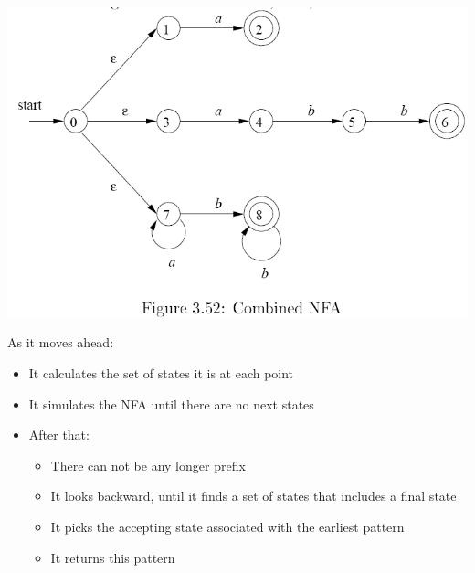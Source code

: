 \documentclass{article}[18pt]
\begin{document}
\begin{center}
	\includegraphics[scale=0.7]{combined}
\end{center}
As it moves ahead:
\begin{itemize}
	\item It calculates the set of states it is at each point
	\item It simulates the NFA until there are no next states
	\item After that:
	\begin{itemize}
		\item There can not be any longer prefix
		\item It looks backward, until it finds a set of states that includes a final state
		\item It picks the accepting state associated with the earliest pattern
		\item It returns this pattern
	\end{itemize}
\end{itemize}
\end{document}
